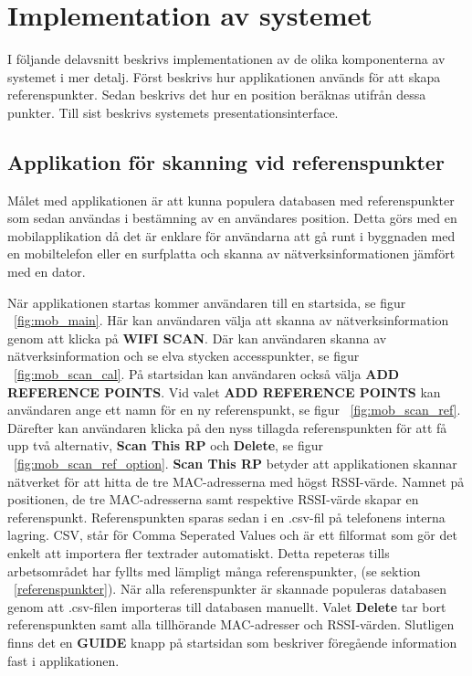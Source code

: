 \documentclass[a4paper,12pt]{article}
\begin{document}
 \section{Implementation av systemet}
 I följande delavsnitt beskrivs implementationen av de olika komponenterna av systemet i mer detalj. Först beskrivs hur applikationen används för att skapa referenspunkter. Sedan beskrivs det hur en position beräknas utifrån dessa punkter. Till sist beskrivs systemets presentationsinterface.

 \subsection{Applikation för skanning vid referenspunkter}
 Målet med applikationen är att kunna populera databasen med referenspunkter som sedan användas i bestämning av en användares position. Detta görs med en mobilapplikation då det är enklare för användarna att gå runt i byggnaden med en mobiltelefon eller en surfplatta och skanna av nätverksinformationen jämfört med en dator.

 När applikationen startas kommer användaren till en startsida, se figur ~\ref{fig:mob_main}. Här kan användaren välja att skanna av nätverksinformation genom att klicka på \textbf{WIFI SCAN}. Där kan användaren skanna av nätverksinformation och se elva stycken accesspunkter, se figur ~\ref{fig:mob_scan_cal}. På startsidan kan användaren också välja \textbf{ADD REFERENCE POINTS}. Vid valet \textbf{ADD REFERENCE POINTS} kan användaren ange ett namn för en ny referenspunkt, se figur ~\ref{fig:mob_scan_ref}. Därefter kan användaren klicka på den nyss tillagda referenspunkten för att få upp två alternativ, \textbf{Scan This RP} och \textbf{Delete}, se figur ~\ref{fig:mob_scan_ref_option}. \textbf{Scan This RP} betyder att applikationen skannar nätverket för att hitta de tre MAC-adresserna med högst RSSI-värde. Namnet på positionen, de tre MAC-adresserna samt respektive RSSI-värde skapar en referenspunkt. Referenspunkten sparas sedan i en .csv-fil på telefonens interna lagring.
 CSV, står för Comma Seperated Values och är ett filformat som gör det enkelt att importera fler textrader automatiskt. Detta repeteras tills arbetsområdet har fyllts med lämpligt många referenspunkter, (se sektion ~\ref{referenspunkter}). När alla referenspunkter är skannade populeras databasen genom att .csv-filen importeras till databasen manuellt. Valet \textbf{Delete} tar bort referenspunkten samt alla tillhörande MAC-adresser och RSSI-värden. Slutligen finns det en \textbf{GUIDE} knapp på startsidan som beskriver föregående information fast i applikationen.
\end{document}
